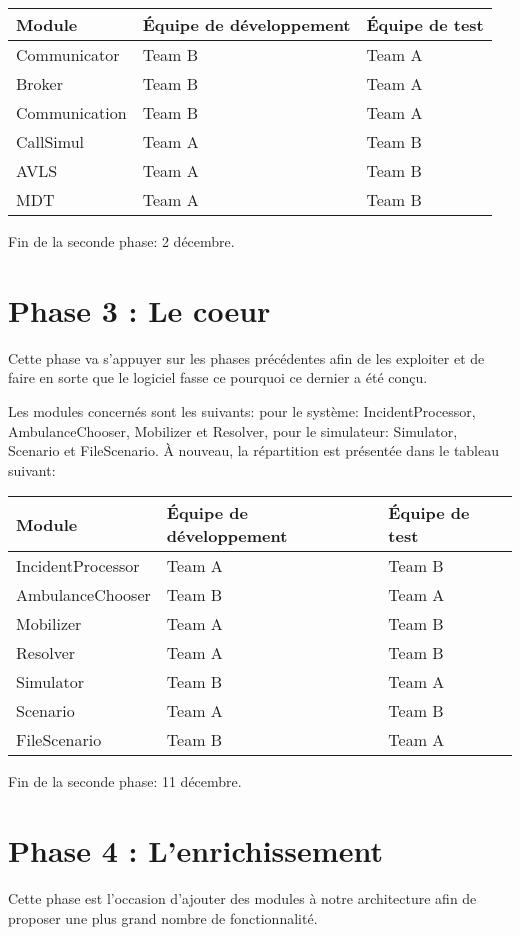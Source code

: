 \noindent\begin{tabularx}{\textwidth}{|l|l|X|}
\hline
Module			& 	Équipe de développement & Équipe de test\\
\hline
Communicator	&	Team B 	&	Team A\\
Broker			&	Team B	&	Team A\\
Communication 	&	Team B	&	Team A	\\
CallSimul		&	Team A	&	Team B	\\
AVLS			&	Team A	&	Team B	\\
MDT				&	Team A	&	Team B	\\
\hline
\end{tabularx}

Fin de la seconde phase: 2 décembre.

\section{Phase 3 : Le coeur}
Cette phase va s'appuyer sur les phases précédentes afin de les exploiter
et de faire en sorte que le logiciel fasse ce pourquoi ce dernier a été conçu.

Les modules concernés sont les suivants: pour le système: IncidentProcessor,
AmbulanceChooser, Mobilizer et Resolver, pour le simulateur: Simulator,
Scenario et FileScenario.
À nouveau, la répartition est présentée dans le tableau suivant:

\noindent\begin{tabularx}{\textwidth}{|l|l|X|}
\hline
Module			& 	Équipe de développement & Équipe de test\\
\hline
IncidentProcessor	&	Team A 	&	Team B\\
AmbulanceChooser	&	Team B	&	Team A\\
Mobilizer 			&	Team A	&	Team B	\\
Resolver			&	Team A	&	Team B	\\
Simulator			&	Team B	&	Team A	\\
Scenario			&	Team A	&	Team B	\\
FileScenario		&	Team B	&	Team A	\\
\hline
\end{tabularx}

Fin de la seconde phase: 11 décembre.

\section{Phase 4 : L'enrichissement}
Cette phase est l'occasion d'ajouter des modules à notre architecture afin de 
proposer une plus grand nombre de fonctionnalité.

